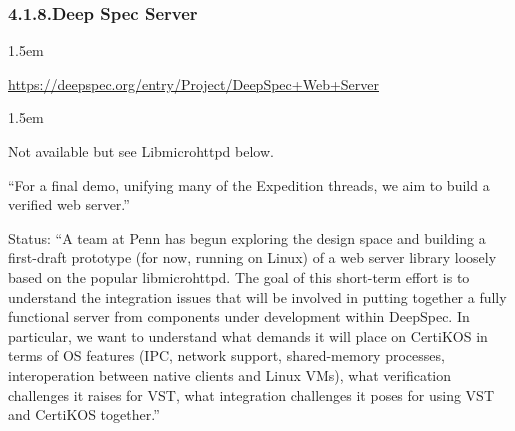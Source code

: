 \documentclass[12pt,twoside]{article}
\begin{document}
\subsubsection{4.1.8.\hspace*{0.5em}Deep Spec Server}%

\begin{mddefinitions}%


\begin{mdbmarginx}{}{}{}{1.5em}%
\begin{mddefdata}%
\href{https://deepspec.org/entry/Project/DeepSpec+Web+Server}{{\ttfamily https://\hspace{0pt}deepspec.\hspace{0pt}org/\hspace{0pt}entry/\hspace{0pt}Project/\hspace{0pt}DeepSpec+\hspace{0pt}Web+\hspace{0pt}Server}}
\end{mddefdata}%
\end{mdbmarginx}%


\begin{mdbmarginx}{}{}{}{1.5em}%
\begin{mddefdata}%
Not available but see Libmicrohttpd below.%
\end{mddefdata}%
\end{mdbmarginx}%
\end{mddefinitions}%

\noindent{}\textquotedblleft{}For a final demo, unifying many of the Expedition threads, we aim to
build a verified web server.\textquotedblright{}%

Status: \textquotedblleft{}A team at Penn has begun exploring the design space and
building a first-draft prototype (for now, running on Linux) of a web
server library loosely based on the popular libmicrohttpd.  The goal
of this short-term effort is to understand the integration issues that
will be involved in putting together a fully functional server from
components under development within DeepSpec.  In particular, we want
to understand what demands it will place on CertiKOS in terms of OS
features (IPC, network support, shared-memory processes,
interoperation between native clients and Linux VMs), what
verification challenges it raises for VST, what integration challenges
it poses for using VST and CertiKOS together.\textquotedblright{}%
\end{document}

